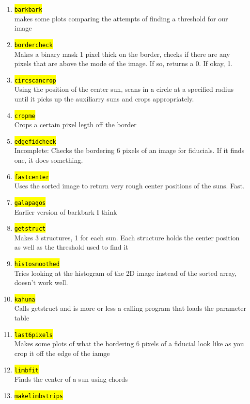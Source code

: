 \documentclass[10pt]{scrartcl}
\begin{document}
\begin{enumerate}
	\item \hl{\texttt{barkbark}}\\
		makes some plots comparing the attempts of finding a threshold for our image
	\item \hl{\texttt{bordercheck}}\\
		Makes a binary mask 1 pixel thick on the border, checks if there are any pixels that are above the mode of the image. If so, returns a 0. If okay, 1.
	\item \hl{\texttt{circscancrop}}\\
		Using the position of the center sun, scans in a circle at a specified radius until it picks up the auxiliarry suns and crops appropriately.
	\item \hl{\texttt{cropme}}\\
		Crops a certain pixel legth off the border
	\item \hl{\texttt{edgefidcheck}}\\
		Incomplete: Checks the bordering 6 pixels of an image for fiducials. If it finds one, it does something.
	\item \hl{\texttt{fastcenter}}\\
		Uses the sorted image to return very rough center positions of the suns. Fast.
	\item \hl{\texttt{galapagos}}\\
		Earlier version of barkbark I think
	\item \hl{\texttt{getstruct}}\\
		Makes 3 structures, 1 for each sun. Each structure holds the center position as well as the threshold used to find it
	\item \hl{\texttt{histosmoothed}}\\
		Tries looking at the histogram of the 2D image instead of the sorted array, doesn't work well.
	\item \hl{\texttt{kahuna}}\\
		Calls getstruct and is more or less a calling program that loads the parameter table
	\item \hl{\texttt{last6pixels}}\\
		Makes some plots of what the bordering 6 pixels of a fiducial look like as you crop it off the edge of the iamge
	\item \hl{\texttt{limbfit}}\\
		Finds the center of a sun using chords
	\item \hl{\texttt{makelimbstrips}}\\

\end{enumerate}
\end{document}
